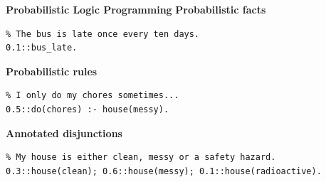 \documentclass[aspectratio=169]{beamer}
\begin{document}
\begin{frame}[fragile]{\textbf{Probabilistic Logic Programming}}
  \textbf{\color{palette-blue}Probabilistic facts}

  \begin{verbatim}
% The bus is late once every ten days.
0.1::bus_late.
  \end{verbatim}

  \pause%

  \vspace{0.5cm}

  \textbf{\color{palette-blue}Probabilistic rules}

  \begin{verbatim}
% I only do my chores sometimes...
0.5::do(chores) :- house(messy).
  \end{verbatim}

  \pause%

  \vspace{0.5cm}

  \textbf{\color{palette-blue}Annotated disjunctions}

  \begin{verbatim}
% My house is either clean, messy or a safety hazard.
0.3::house(clean); 0.6::house(messy); 0.1::house(radioactive).
  \end{verbatim}

  \pause%

  \vspace{0.5cm}

  \begin{center}
    \color{palette-yellow}
  \end{center}
\end{frame}

\end{document}
